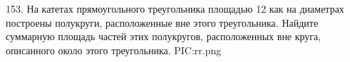 153. На катетах прямоугольного треугольника площадью 12 как на диаметрах построены полукруги, расположенные вне этого треугольника. Найдите суммарную площадь частей этих полукругов, расположенных вне круга, описанного около этого треугольника.
{{PIC:rr.png}}\\
